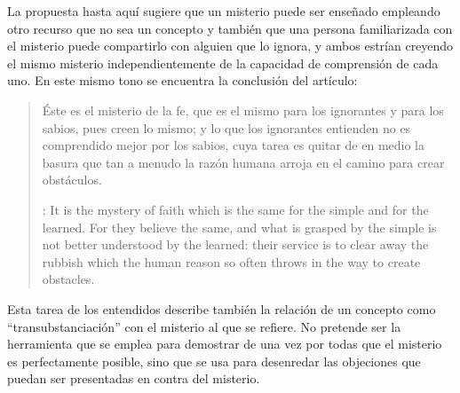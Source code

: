 La propuesta hasta aquí sugiere que un misterio puede ser enseñado empleando otro recurso que no sea un concepto y también que una persona familiarizada con el misterio puede compartirlo con alguien que lo ignora, y ambos estrían creyendo el mismo misterio independientemente de la capacidad de comprensión de cada uno. En este mismo tono se encuentra la conclusión del artículo: \blockquote[{\cite[112]{anscombe1981erp:ot}}: It is the mystery of faith which is the same for the simple and for the learned. For they believe the same, and what is grasped by the simple is not better understood by the learned: their service is to clear away the rubbish which the human reason so often throws in the way to create obstacles.]{Éste es el misterio de la fe, que es el mismo para los ignorantes y para los sabios, pues creen lo mismo; y lo que los ignorantes entienden no es comprendido mejor por los sabios, cuya tarea es quitar de en medio la basura que tan a menudo la razón humana arroja en el camino para crear obstáculos.} Esta tarea de los entendidos describe también la relación de un concepto como \enquote{transubstanciación} con el misterio al que se refiere. No pretende ser la herramienta que se emplea para demostrar de una vez por todas que el misterio es perfectamente posible, sino que se usa para desenredar las objeciones que puedan ser presentadas en contra del misterio.

